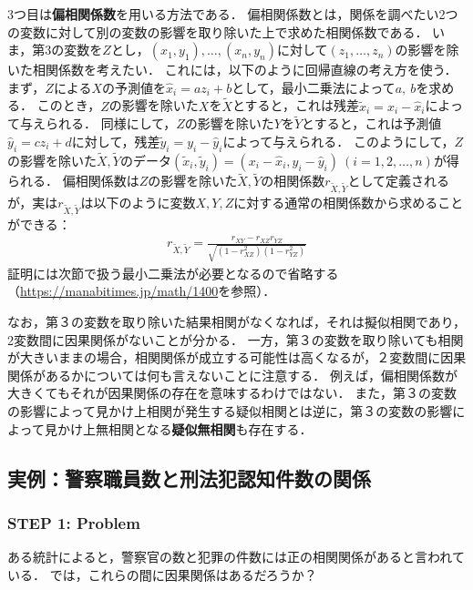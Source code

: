 %
3つ目は\textbf{偏相関係数}を用いる方法である．
%
偏相関係数とは，関係を調べたい2つの変数に対して別の変数の影響を取り除いた上で求めた相関係数である．
%
いま，第3の変数を$ Z $とし，$ (x_{1}, y_{1}), \ldots, (x_{n}, y_{n}) $に対して$ (z_{1}, \ldots, z_{n}) $の影響を除いた相関係数を考えたい．
%
これには，以下のように回帰直線の考え方を使う．
%
まず，$ Z $による$ X $の予測値を$ \hat{x}_{i} = a z_{i} + b $として，最小二乗法によって$ a,\ b $を求める．
%
このとき，$ Z $の影響を除いた$ X $を$ \tilde{X} $とすると，これは残差$ \tilde{x}_{i} = x_{i} - \hat{x}_{i} $によって与えられる．
%
同様にして，$ Z $の影響を除いた$ Y $を$ \tilde{Y} $とすると，これは予測値$ \hat{y}_{i} = c z_{i} + d $に対して，残差$ \tilde{y}_{i} = y_{i} - \hat{y}_{i} $によって与えられる．
%
このようにして，$ Z $の影響を除いた$ \tilde{X}, \tilde{Y} $のデータ$ (\tilde{x}_{i}, \tilde{y}_{i})=(x_{i}-\hat{x}_{i}, y_{i}-\hat{y}_{i})\ (i=1,2,\ldots, n) $が得られる．
%
偏相関係数は$ Z $の影響を除いた$ \tilde{X}, \tilde{Y} $の相関係数$ r_{\tilde{X}, \tilde{Y}} $として定義されるが，実は$ r_{\tilde{X}, \tilde{Y}} $は以下のように変数$ X,Y,Z $に対する通常の相関係数から求めることができる：
%
\begin{align}
	r_{\tilde{X}, \tilde{Y}} = \frac{r_{XY} - r_{XZ} r_{YZ}}{\sqrt{(1-r_{XZ}^{2})(1-r_{YZ}^{2})}}
	\label{eq:tpartial_correlation}
\end{align}
%
証明には次節で扱う最小二乗法が必要となるので省略する（\url{https://manabitimes.jp/math/1400}を参照）．
%

%
なお，第３の変数を取り除いた結果相関がなくなれば，それは擬似相関であり，2変数間に因果関係がないことが分かる．
%
一方，第３の変数を取り除いても相関が大きいままの場合，相関関係が成立する可能性は高くなるが，２変数間に因果関係があるかについては何も言えないことに注意する．
%
例えば，偏相関係数が大きくてもそれが因果関係の存在を意味するわけではない．
%
また，第３の変数の影響によって見かけ上相関が発生する疑似相関とは逆に，第３の変数の影響によって見かけ上無相関となる\textbf{疑似無相関}も存在する．
%


\subsection{実例：警察職員数と刑法犯認知件数の関係\cite{b}}

\subsubsection*{STEP 1: Problem}
%
ある統計によると，警察官の数と犯罪の件数には正の相関関係があると言われている．
%
では，これらの間に因果関係はあるだろうか？
%

